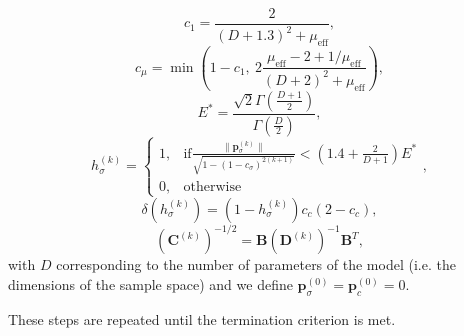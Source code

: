 \begin{equation}
c_1=\frac{2}{(D+1.3)^2+\mu_{\mathrm{eff}}},
\end{equation}
\begin{equation}
c_\mu=\min\left(1-c_1,\ 2\frac{\mu_{\mathrm{eff}}-2+1/\mu_{\mathrm{eff}}}{(D+2)^2+\mu_{\mathrm{eff}}}\right),
\end{equation}
\begin{equation}
E^*=\frac{\sqrt{2}\Gamma\left(\frac{D+1}{2}\right)}{\Gamma\left(\frac{D}{2}\right)},
\end{equation}
\begin{equation}h_\sigma^{(k)}=
\begin{cases} 
      1, & \mathrm{if} \frac{\|\mathbf{p}^{(k)}_\sigma\|}{\sqrt{1-\left(1-c_\sigma\right)^{2(k+1)}}}<\left(1.4+\frac{2}{D+1}\right)E^*\\
      0, & \mathrm{otherwise}
   \end{cases},
\end{equation}
\begin{equation}
\delta\left(h_\sigma^{(k)}\right)=\left(1-h_\sigma^{(k)}\right)c_c\left(2-c_c\right),
\end{equation}
\begin{equation}
\left(\mathbf{C}^{(k)}\right)^{-1/2}=\mathbf{B}\left(\mathbf{D}^{(k)}\right)^{-1}\mathbf{B}^T,
\end{equation}
\noindent with $D$ corresponding to the number of parameters of the model (i.e. the dimensions of the sample space) and we define $\mathbf{p}_\sigma^{(0)}=\mathbf{p}_c^{(0)}=0$.


These steps are repeated until the termination criterion is met.












